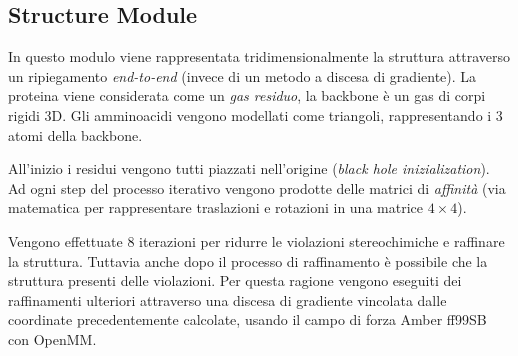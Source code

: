 \subsection{Structure Module}

In questo modulo viene rappresentata tridimensionalmente la struttura attraverso un ripiegamento \textit{end-to-end} (invece di un metodo a discesa di gradiente). La proteina viene considerata come un \textit{gas residuo}, la backbone è un gas di corpi rigidi 3D. Gli amminoacidi vengono modellati come triangoli, rappresentando i 3 atomi della backbone. 

\par All'inizio i residui vengono tutti piazzati nell'origine (\textit{black hole inizialization}). Ad ogni step del processo iterativo vengono prodotte delle matrici di \textit{affinità} (via matematica per rappresentare traslazioni e rotazioni in una matrice $4\times 4$).

\par Vengono effettuate 8 iterazioni per ridurre le violazioni stereochimiche e raffinare la struttura. Tuttavia anche dopo il processo di raffinamento è possibile che la struttura presenti delle violazioni. Per questa ragione vengono eseguiti dei raffinamenti ulteriori attraverso una discesa di gradiente vincolata dalle coordinate precedentemente calcolate, usando il campo di forza Amber ff99SB con OpenMM.


